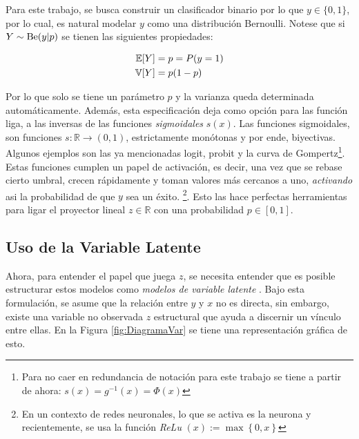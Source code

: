 \documentclass[../Main/Main.tex]{subfiles}
\begin{document}
Para este trabajo, se busca construir un clasificador binario por lo que $y \in \{0,1\}$, por lo cual, es natural modelar $y$ como una distribución Bernoulli. Notese que si $Y \sim \text{Be}(y|p)$ se tienen las siguientes propiedades: 

\begin{align*}
	\mathbb{E}[Y] &= p = P(y = 1) \\
	\mathbb{V}[Y] &= p(1-p)
\end{align*}

Por lo que solo se tiene un parámetro $p$ y la varianza queda determinada automáticamente. Además, esta especificación deja como  opción para las función liga, a las inversas de las funciones \textit{sigmoidales} $s(x)$. Las funciones sigmoidales, son funciones $s:\mathbb{R}\rightarrow (0,1)$, estrictamente monótonas y por ende, biyectivas. Algunos ejemplos son las ya mencionadas logit, probit y la curva de Gompertz\footnote{Para no caer en redundancia de notación para este trabajo se tiene a partir de ahora: $s(x) = g^{-1}(x) = \Phi(x)$}. Estas funciones cumplen un papel de activación, es decir, una vez que se rebase cierto umbral, crecen rápidamente y toman valores más cercanos a uno, \textit{activando} asi la probabilidad de que $y$ sea un éxito. \footnote{En un contexto de redes neuronales, lo que se activa es la neurona y recientemente, se usa la función \textit{ReLu} $(x):= \max\left\{0,x\right\}$}. Esto las hace perfectas herramientas para ligar el proyector lineal $z\in\mathbb{R}$ con una probabilidad $p\in[0,1]$.\\

\subsection{Uso de la Variable Latente}

Ahora, para entender el papel que juega $z$, se necesita entender que es posible estructurar estos modelos como \textit{modelos de variable latente} \autocite{albert1993bayesian}. Bajo esta formulación, se asume que la relación entre $y$ y $x$ no es directa, sin embargo, existe una variable no observada $z$ estructural que ayuda a discernir un vínculo entre ellas. En la Figura \ref{fig:DiagramaVar} se tiene una representación gráfica de esto. \\
\end{document}
